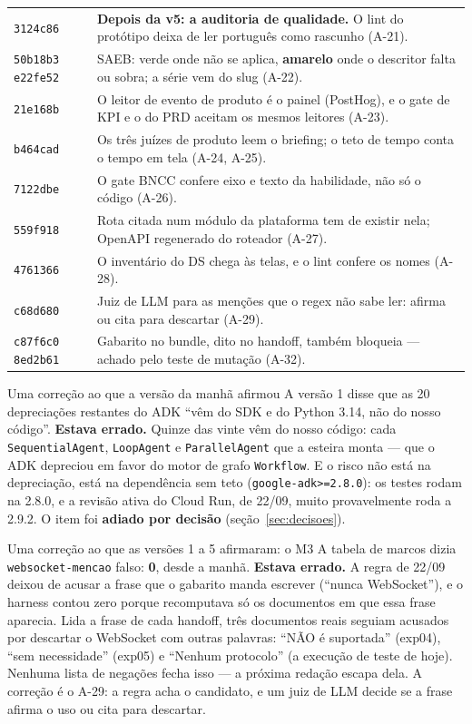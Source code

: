 \documentclass[11pt,a4paper]{article}
\newcommand{\amarelo}{\textcolor{DarkYellow}{\textbf{amarelo}}}
\begin{document}
\begin{center}
\begin{tabular}{@{}p{1.7cm}p{13.6cm}@{}}
\midrule
\texttt{3124c86} & \textbf{Depois da v5: a auditoria de qualidade.} O lint do protótipo deixa de ler português como rascunho (A-21). \\
\texttt{50b18b3} \texttt{e22fe52} & SAEB: verde onde não se aplica, \amarelo{} onde o descritor falta ou sobra; a série vem do slug (A-22). \\
\texttt{21e168b} & O leitor de evento de produto é o painel (PostHog), e o gate de KPI e o do PRD aceitam os mesmos leitores (A-23). \\
\texttt{b464cad} & Os três juízes de produto leem o briefing; o teto de tempo conta o tempo em tela (A-24, A-25). \\
\texttt{7122dbe} & O gate BNCC confere eixo e texto da habilidade, não só o código (A-26). \\
\texttt{559f918} & Rota citada num módulo da plataforma tem de existir nela; OpenAPI regenerado do roteador (A-27). \\
\texttt{4761366} & O inventário do DS chega às telas, e o lint confere os nomes (A-28). \\
\texttt{c68d680} & Juiz de LLM para as menções que o regex não sabe ler: afirma ou cita para descartar (A-29). \\
\texttt{c87f6c0} \texttt{8ed2b61} & Gabarito no bundle, dito no handoff, também bloqueia --- achado pelo teste de mutação (A-32). \\
\bottomrule
\end{tabular}
\end{center}

\begin{alertabox}{Uma correção ao que a versão da manhã afirmou}
A versão 1 disse que as 20 depreciações restantes do ADK ``vêm do SDK e do Python 3.14, não do nosso código''. \textbf{Estava errado.} Quinze das vinte vêm do nosso código: cada \texttt{SequentialAgent}, \texttt{LoopAgent} e \texttt{ParallelAgent} que a esteira monta --- que o ADK depreciou em favor do motor de grafo \texttt{Workflow}. E o risco não está na depreciação, está na dependência sem teto (\texttt{google-adk>=2.8.0}): os testes rodam na 2.8.0, e a revisão ativa do Cloud Run, de 22/09, muito provavelmente roda a 2.9.2. O item foi \textbf{adiado por decisão} (seção~\ref{sec:decisoes}).
\end{alertabox}

\begin{alertabox}{Uma correção ao que as versões 1 a 5 afirmaram: o M3}
A tabela de marcos dizia \texttt{websocket-mencao} falso: \textbf{0}, desde a manhã. \textbf{Estava errado.} A regra de 22/09 deixou de acusar a frase que o gabarito manda escrever (``nunca WebSocket''), e o harness contou zero porque recomputava só os documentos em que essa frase aparecia. Lida a frase de cada handoff, três documentos reais seguiam acusados por descartar o WebSocket com outras palavras: ``NÃO é suportada'' (exp04), ``sem necessidade'' (exp05) e ``Nenhum protocolo'' (a execução de teste de hoje). Nenhuma lista de negações fecha isso --- a próxima redação escapa dela. A correção é o A-29: a regra acha o candidato, e um juiz de LLM decide se a frase afirma o uso ou cita para descartar.
\end{alertabox}
\end{document}
